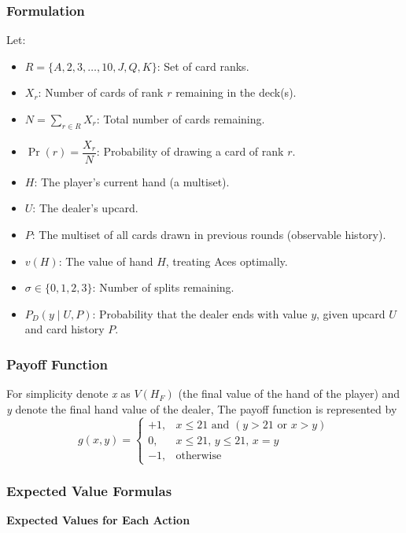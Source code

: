 \documentclass[12pt,a4paper]{cibb}
\begin{document}
\subsubsection{Formulation}
Let:
\begin{itemize}
    \item \( R = \{A, 2, 3, \dots, 10, J, Q, K\} \): Set of card ranks.
    \item \( X_r \): Number of cards of rank \(r\) remaining in the deck(s). 
    \item \( N = \sum_{r \in R} X_r \): Total number of cards remaining. 
    \item \( \Pr(r) = \dfrac{X_r}{N} \): Probability of drawing a card of rank \(r\). 
    \item \( H \): The player's current hand (a multiset).
    \item \( U \): The dealer's upcard.
    \item \( P \): The multiset of all cards drawn in previous rounds (observable history).
    \item \( v(H) \): The value of hand \(H\), treating Aces optimally.
    \item \( \sigma \in \{0,1,2,3\} \): Number of splits remaining.
    \item \( P_D(y \mid U, P) \): Probability that the dealer ends with value \(y\), given upcard \(U\) and card history \(P\).
\end{itemize}


\subsubsection{Payoff Function}
For simplicity denote \textit{x} as \( V(H_F)\) (the final value of the hand of the player) and \textit{y} denote the final hand value of the dealer,  
The payoff function is represented by
\[
g(x, y) =
\begin{cases}
+1, & x \leq 21 \text{ and } (y > 21 \text{ or } x > y) \\
0, & x \leq 21,\, y \leq 21,\, x = y \\
-1, & \text{otherwise}
\end{cases}
\]
\subsubsection{Expected Value Formulas}

\textbf{Expected Values for Each Action}
\end{document}
